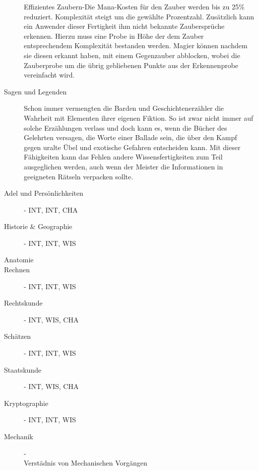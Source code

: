 \documentclass[a4paper,12pt,oneside]{book}
\begin{document}
\begin{description}
Effizientes Zaubern-Die Mana-Kosten für den Zauber werden bis zu 25\% reduziert. Komplexität steigt um die gewählte Prozentzahl.
Zusätzlich kann ein Anwender dieser Fertigkeit ihm nicht bekannte Zaubersprüche erkennen. Hierzu muss eine Probe in Höhe der dem Zauber entsprechendem Komplexität bestanden werden. Magier können nachdem sie diesen erkannt haben, mit einem Gegenzauber abblocken, wobei die Zauberprobe um die übrig gebliebenen Punkte aus der Erkennenprobe vereinfacht wird.
\item[Sagen und Legenden]Schon immer vermengten die Barden und Geschichtenerzähler die Wahrheit mit Elementen ihrer eigenen Fiktion. So ist zwar nicht immer auf solche Erzählungen verlass und doch kann es, wenn die Bücher des Gelehrten versagen, die Worte einer Ballade sein, die über den Kampf gegen uralte Übel und exotische Gefahren entscheiden kann. Mit dieser Fähigkeiten kann das Fehlen andere Wissensfertigkeiten zum Teil ausgeglichen werden, auch wenn der Meister die Informationen in geeigneten Rätseln verpacken sollte.
\item[Adel und Persönlichkeiten]- INT, INT, CHA
\item[Historie \& Geographie]- INT, INT, WIS
\item[Anatomie]
\item[Rechnen]- INT, INT, WIS
\item[Rechtskunde]- INT, WIS, CHA
\item[Schätzen]- INT, INT, WIS
\item[Staatskunde]- INT, WIS, CHA
\item[Kryptographie]- INT, INT, WIS
\item[Mechanik]-
\\Verstädnis von Mechanischen Vorgängen 
\end{description}
\end{document}
